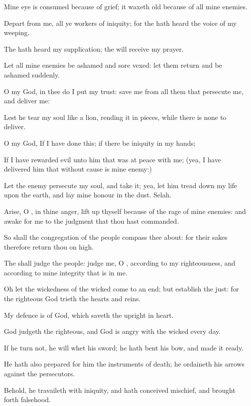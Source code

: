 \Verse Mine eye is consumed because of grief; it waxeth old because of all mine enemies.

\Verse Depart from me, all ye workers of iniquity; for the \LORD hath heard the voice of my weeping.

\Verse The \LORD hath heard my supplication; the \LORD will receive my prayer.

\Verse Let all mine enemies be ashamed and sore vexed: let them return and be ashamed suddenly.




\Chapter
\Verse O \LORD my God, in thee do I put my trust: save me from all them that persecute me, and deliver me:

\Verse Lest he tear my soul like a lion, rending it in pieces, while there is none to deliver.

\Verse O \LORD my God, If I have done this; if there be iniquity in my hands;

\Verse If I have rewarded evil unto him that was at peace with me; (yea, I have delivered him that without cause is mine enemy:)

\Verse Let the enemy persecute my soul, and take it; yea, let him tread down my life upon the earth, and lay mine honour in the dust. Selah.

\Verse Arise, O \LORD, in thine anger, lift up thyself because of the rage of mine enemies: and awake for me to the judgment that thou hast commanded.

\Verse So shall the congregation of the people compass thee about: for their sakes therefore return thou on high.

\Verse The \LORD shall judge the people: judge me, O \LORD, according to my righteousness, and according to mine integrity that is in me.

\Verse Oh let the wickedness of the wicked come to an end; but establish the just: for the righteous God trieth the hearts and reins.

\Verse My defence is of God, which saveth the upright in heart.

\Verse God judgeth the righteous, and God is angry with the wicked every day.

\Verse If he turn not, he will whet his sword; he hath bent his bow, and made it ready.

\Verse He hath also prepared for him the instruments of death; he ordaineth his arrows against the persecutors.

\Verse Behold, he travaileth with iniquity, and hath conceived mischief, and brought forth falsehood.

